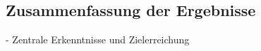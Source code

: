 \subsection{Zusammenfassung der Ergebnisse} \label{sec:Zusammenfassung der Ergebnisse}

- Zentrale Erkenntnisse und Zielerreichung